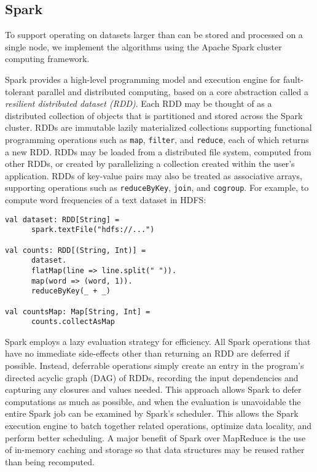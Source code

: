 \subsection{Spark}

To support operating on datasets larger than can be stored and processed on a single node,
we implement the algorithms using the Apache Spark cluster computing framework.

Spark provides a high-level programming model and execution engine for
fault-tolerant parallel and distributed computing, based on a core 
abstraction called a \textit{resilient distributed dataset (RDD)}.
Each RDD may be thought of as a distributed collection of objects that is
partitioned and stored across the Spark cluster.
RDDs are immutable lazily materialized collections supporting functional
programming operations such as \texttt{map}, \texttt{filter}, and \texttt{reduce},
each of which returns a new RDD.
RDDs may be loaded from a distributed file system, computed from other RDDs,
or created by parallelizing a collection created within the user's application.
RDDs of key-value pairs may also be treated as associative arrays, supporting
operations such as \texttt{reduceByKey}, \texttt{join}, and \texttt{cogroup}.
For example, to compute word frequencies of a text dataset in HDFS:
\begin{verbatim}
val dataset: RDD[String] =
      spark.textFile("hdfs://...")

val counts: RDD[(String, Int)] =
      dataset.
      flatMap(line => line.split(" ")).
      map(word => (word, 1)).
      reduceByKey(_ + _)

val countsMap: Map[String, Int] =
      counts.collectAsMap
\end{verbatim}

Spark employs a lazy evaluation strategy for efficiency.
All Spark operations that have no immediate side-effects other than returning an RDD are deferred
if possible.
Instead, deferrable operations simply create an entry in the program's directed acyclic graph (DAG) of RDDs, recording the input
dependencies and capturing any closures and values needed.
This approach allows Spark to defer computations as much as possible, and when the evaluation
is unavoidable the entire Spark job can be examined by Spark's scheduler.
This allows the Spark execution engine to batch together related operations, optimize data locality,
and perform better scheduling.
A major benefit of Spark over MapReduce is the use of in-memory caching and storage so that data structures
may be reused rather than being recomputed.


